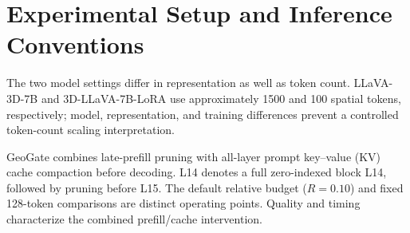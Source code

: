 \section{Experimental Setup and Inference Conventions}
\label{sec:supp_protocols}
The two model settings differ in representation as well as token count. LLaVA-3D-7B and 3D-LLaVA-7B-LoRA use approximately 1500 and 100 spatial tokens, respectively; model, representation, and training differences prevent a controlled token-count scaling interpretation.

GeoGate combines late-prefill pruning with all-layer prompt key--value (KV) cache compaction before decoding. L14 denotes a full zero-indexed block L14, followed by pruning before L15. The default relative budget ($R=0.10$) and fixed 128-token comparisons are distinct operating points. Quality and timing characterize the combined prefill/cache intervention.


